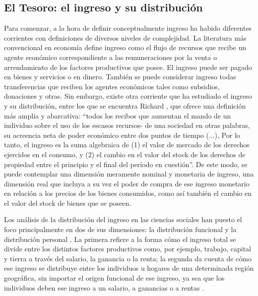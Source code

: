 	\subsection{El Tesoro: el ingreso y su distribución}
Para comenzar, a la hora de definir conceptualmente ingreso ha habido diferentes corrientes con definiciones de diversos niveles de complejidad. La literatura más convencional en economía define ingreso como el flujo de recursos que recibe un agente económico correspondiente a las remuneraciones por la venta o arrendamiento de los factores productivos que posee. El ingreso puede ser pagado en bienes y servicios o en dinero. También se puede considerar ingreso todas transferencias que reciben los agentes económicos tales como subsidios, donaciones y otras. Sin embargo, existe otra corriente que ha estudiado el ingreso y su distribución, entre los que se encuentra Richard , que ofrece una definición más amplia y abarcativa: “todos los recibos que aumentan el mando de un individuo sobre el uso de los escasos recursos- de una sociedad en otras palabras, su acreencia neta de poder económico entre dos puntos de tiempo (...), Por lo tanto, el ingreso es la suma algebraica de (1) el valor de mercado de los derechos ejercidos en el consumo, y (2) el cambio en el valor del stock de los derechos de propiedad entre el principio y el final del período en cuestión”. De este modo, se puede contemplar una dimensión meramente nominal y monetaria de ingreso, una dimensión real que incluya a su vez el poder de compra de ese ingreso monetario en relación a los precios de los bienes consumidos, como así también el cambio en el valor del stock de bienes que se poseen.

Los análisis de la distribución del ingreso en las ciencias sociales han puesto el foco principalmente en dos de sus dimensiones: la distribución funcional y la distribución personal \cite{bemis}. La primera refiere a la forma cómo el ingreso total se divide entre los distintos factores productivos como, por ejemplo, trabajo, capital y tierra a través del salario, la ganancia o la renta; la segunda da cuenta de cómo ese ingreso se distribuye entre los individuos u hogares de una determinada región geográfica, sin importar el origen funcional de ese ingreso, ya sea que los individuos deben ese ingreso a un salario, a ganancias o a rentas \cite{gasparini2001}. 

